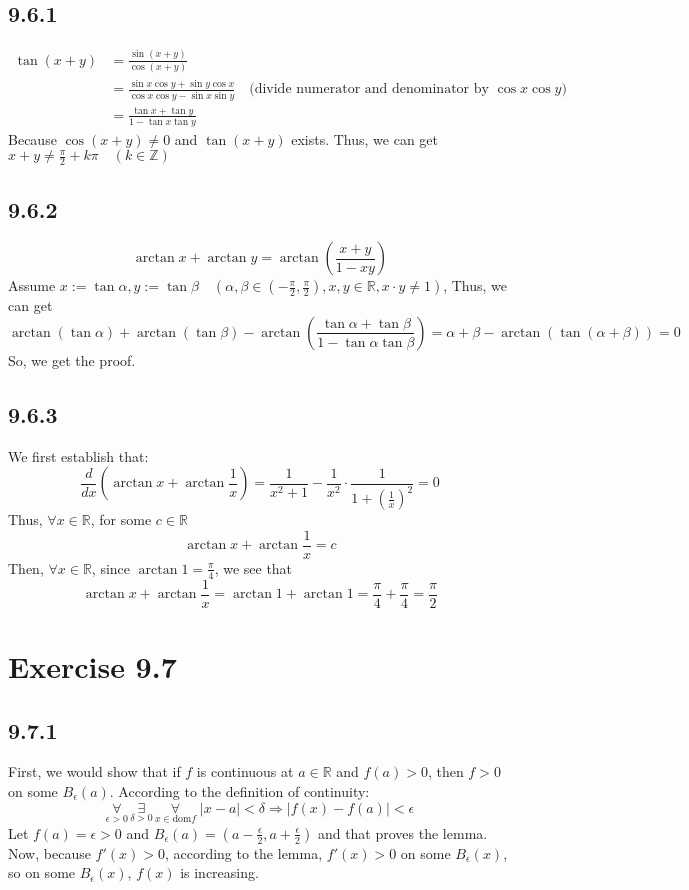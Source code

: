 \documentclass[11pt,twoside,a4paper]{article}
\begin{document}
\subsection{9.6.1}
\begin{equation}
    \begin{aligned}
    \tan (x+y)&=\frac{\sin (x+y)}{\cos (x+y)} \\
        &=  \frac{\sin x \cos y+\sin y \cos x}{\cos x \cos y-\sin x\sin y} 
        \quad\text{(divide numerator and denominator by $\cos x \cos y$)}\\
        &=\frac{\tan x+\tan y}{1-\tan x\tan y}
    \end{aligned}
\end{equation}
Because $\cos (x+y) \neq 0$ and $\tan (x+y)$ exists. Thus, we can get 
$\displaystyle x+y\neq \frac{\pi}{2}+k\pi\quad (k\in \mathbb{Z})$

\subsection{9.6.2}
$$\arctan x+\arctan y=\arctan (\frac{x+y}{1-xy})$$
Assume $\displaystyle x:=\tan \alpha ,y:=\tan \beta 
\quad (\alpha ,\beta \in (-\frac{\pi}{2},\frac{\pi}{2}),x,y\in \mathbb{R},x\cdot y \neq1)$, 
Thus, we can get 
$$
\arctan (\tan \alpha )+\arctan (\tan \beta )
-\arctan (\frac{\tan \alpha +\tan \beta }{1- \tan \alpha \tan \beta })
=\alpha +\beta -\arctan (\tan (\alpha +\beta ))=0
$$
So, we get the proof.

\subsection{9.6.3}
We first establish that:
$$
\frac{d}{dx}(\arctan x+ \arctan \frac{1}{x})=\frac{1}{x^2+1}-\frac{1}{x^2}\cdot\frac{1}{1+(\frac{1}{x})^2}=0
$$
Thus, $\forall x \in \mathbb{R}$, for some $c \in \mathbb{R}$
$$
\arctan x +\arctan\frac{1}{x}=c
$$
Then, $\forall x\in \mathbb{R}$, 
since $\displaystyle \arctan 1=\frac{\pi}{4}$, we see that
$$
\arctan x+ \arctan \frac{1}{x}=\arctan 1+ \arctan 1=\frac{\pi}{4}+\frac{\pi}{4}=\frac{\pi}{2}
$$
\section{Exercise 9.7}
\subsection{9.7.1}
First, we would show that if $f$ is continuous at $a\in\mathbb{R}$ and $f(a)>0$, then $f>0$ on some $B_\epsilon (a)$. According to the definition of continuity:
$$\underset{\epsilon >0}{\forall}\,\underset{\delta >0}{\exists}\,\underset{x\in\text{dom}f}{\forall} \; |x-a|<\delta\Rightarrow|f(x)-f(a)|<\epsilon$$
Let $f(a)=\epsilon >0$ and $B_\epsilon (a)=(a-\frac{\epsilon}{2},a+\frac{\epsilon}{2})$ and that proves the lemma.\newline\newline
Now, because $f'(x)>0$, according to the lemma, $f'(x)>0$ on some $B_\epsilon (x)$, so on some $B_\epsilon (x)$, $f(x)$ is increasing.
\end{document}
